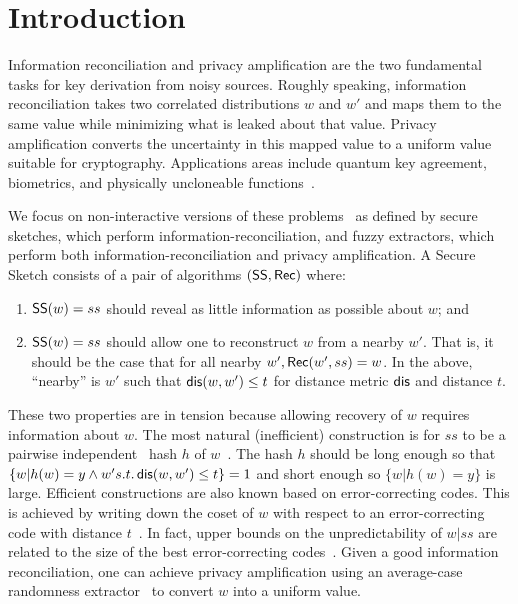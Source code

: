 
\section{Introduction}
Information reconciliation and privacy amplification are the two
fundamental tasks for key derivation from noisy sources.  Roughly
speaking, information reconciliation takes two correlated
distributions $w$ and $w'$ and maps them to the same value while
minimizing what is leaked about that value.  Privacy amplification
converts the uncertainty in this mapped value to a uniform value
suitable for cryptography.  Applications areas include quantum key
agreement, biometrics, and physically uncloneable
functions~\cite{bennett1988privacy,dodis2008fuzzy}.

We focus on non-interactive versions of these problems~\cite{dodis2008fuzzy} as defined by secure sketches, which perform information-recon\-ciliation, and fuzzy extractors, which perform both information-recon\-ciliation and privacy amplification. A Secure Sketch consists of a pair of algorithms $({\mathsf{SS}}, {\mathsf{Rec}})$ where:
\begin{enumerate}
\item ${\mathsf{SS}}(w) = ss$ should reveal as little information as possible about $w$; and
\item ${\mathsf{SS}}(w) =ss$ should allow one to reconstruct $w$ from a nearby $w'$. That is, it should be the case that for all nearby $w', {\mathsf{Rec}}(w', ss) = w$.  In the above, ``nearby'' is $w'$ such that $\mathsf{dis}(w,w')\le t$ for  distance metric $\mathsf{dis}$ and distance $t$.
\end{enumerate}
These two properties are in tension because allowing recovery of $w$ requires information about $w$.  The most natural (inefficient) construction is for $ss$ to be a pairwise independent~\cite{carter1977universal} hash $h$ of $w$~\cite{skoric2009efficient,fuller2016fuzzy,woodage2017new,fuller2020fuzzy}. The hash $h$ should be long enough so that $\{w | h(w) = y \wedge w' s.t.\,\mathsf{dis}(w, w')\le t\} =1$ and short enough so $\{w| h(w) = y\}$ is large. Efficient constructions are also known based on error-correcting codes.  This is achieved by writing down the coset of $w$ with respect to an error-correcting code with distance $t$~\cite{dodis2008fuzzy}.  In fact, upper bounds on the unpredictability of $w | ss$ are related to the size of the best error-correcting codes~\cite{dodis2008fuzzy,fuller2020computational}. 
Given a good information reconciliation, one can achieve privacy amplification using an average-case randomness extractor~\cite{nisan1993randomness} to convert $w$ into a uniform value.

